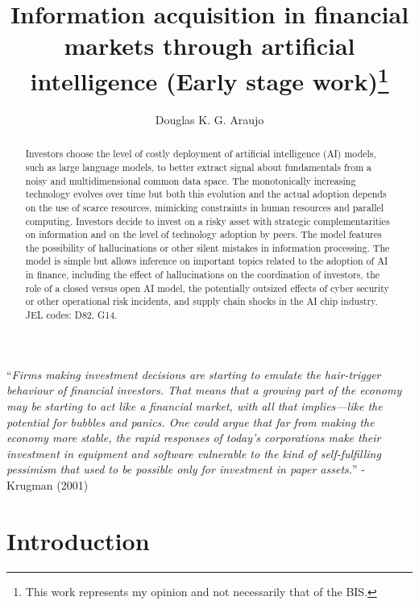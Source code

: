 \documentclass[
]{article}
\title{Information acquisition in financial markets through artificial
intelligence (Early stage work)\thanks{This work represents my opinion
and not necessarily that of the BIS.}}
\author{Douglas K. G. Araujo}
\affil{%
                  Bank for International
Settlements, douglas.araujo@bis.org
              }
\date{}
\theoremstyle{plain}
\theoremstyle{remark}
\begin{document}
\maketitle
\begin{abstract}
Investors choose the level of costly deployment of artificial
intelligence (AI) models, such as large language models, to better
extract signal about fundamentals from a noisy and multidimensional
common data space. The monotonically increasing technology evolves over
time but both this evolution and the actual adoption depends on the use
of scarce resources, mimicking constraints in human resources and
parallel computing. Investors decide to invest on a risky asset with
strategic complementarities on information and on the level of
technology adoption by peers. The model features the possibility of
hallucinations or other silent mistakes in information processing. The
model is simple but allows inference on important topics related to the
adoption of AI in finance, including the effect of hallucinations on the
coordination of investors, the role of a closed versus open AI model,
the potentially outsized effects of cyber security or other operational
risk incidents, and supply chain shocks in the AI chip industry. JEL
codes: D82, G14.
\end{abstract}
\ifdefined\Shaded\renewenvironment{Shaded}{\begin{tcolorbox}[breakable, boxrule=0pt, enhanced, borderline west={3pt}{0pt}{shadecolor}, frame hidden, sharp corners, interior hidden]}{\end{tcolorbox}}\fi

``\emph{Firms making investment decisions are starting to emulate the
hair-trigger behaviour of financial investors. That means that a growing
part of the economy may be starting to act like a financial market, with
all that implies---like the potential for bubbles and panics. One could
argue that far from making the economy more stable, the rapid responses
of today's corporations make their investment in equipment and software
vulnerable to the kind of self-fulfilling pessimism that used to be
possible only for investment in paper assets.}'' - Krugman (2001)

\hypertarget{introduction}{%
\section{Introduction}\label{introduction}}
\end{document}
